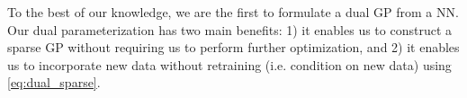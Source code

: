 \documentclass{article}
\newcommand{\mbf}[1]{\mathbf{#1}}
\newcommand{\vw}{\mbf{w}}
\begin{document}
To the best of our knowledge, we are the first to formulate a dual GP from a NN.
Our dual parameterization has two main benefits: 1) it enables us to construct a sparse GP without requiring us to perform further optimization, and 2)
it enables us to incorporate new data without retraining (i.e. condition on new data) using \cref{eq:dual_sparse}.











\end{document}
